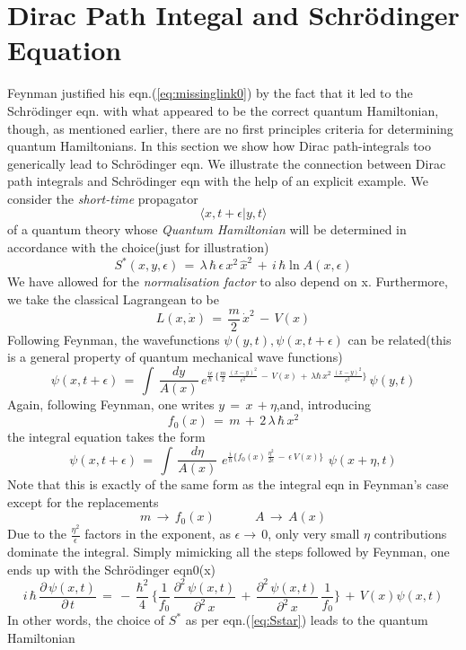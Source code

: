 \documentclass[a4paper]{JHEP3}
\newcommand{\be}{\begin{equation}}
\newcommand{\ee}{\end{equation}}
\begin{document}
\section{Dirac Path Integal and Schr\"odinger Equation}
Feynman justified his eqn.(\ref{eq:missinglink0}) by the fact that it led to the Schr\"odinger eqn. with what appeared to be the correct
quantum Hamiltonian, though, as mentioned earlier, there are no first principles criteria for determining quantum Hamiltonians. In this section
we show how Dirac path-integrals too generically lead to Schr\"odinger eqn. We illustrate the connection between Dirac path integrals and 
Schr\"odinger eqn with the help of an explicit example. We consider the 
{\it short-time} propagator
\be
\langle x,t+\epsilon|y,t\rangle
\ee
of a quantum theory whose {\it Quantum Hamiltonian} will be determined in accordance with the choice(just for illustration) 
\be
\label{eq:Sstar}
S^*(x,y,\epsilon)\,=\,\lambda\,\hbar\,\epsilon\,x^2\,{\hat x}^2\,+\,i\,\hbar\ln{A(x,\epsilon)}
\ee
We have allowed for the \emph{normalisation factor} to also depend on x. Furthermore, we take the classical Lagrangean to be
\be
L(x, {\dot x})\,=\,\frac{m}{2}\,{\dot x}^2\,-\,V(x)
\ee
Following Feynman, the wavefunctions $\psi(y,t),\psi(x,t+\epsilon)$ can be related(this is a general property of quantum mechanical wave
functions)
\be
\psi(x,t+\epsilon)\,=\,\int\,\frac{dy}{A(x)}\,e^{\frac{i\epsilon}{\hbar}\,\{\frac{m}{2}\,\frac{(x-y)^2}{\epsilon^2}\,-\,V(x)\,+\,\lambda\hbar\,x^2\,\frac{(x-y)^2}{\epsilon^2}\}}\,\psi(y,t)
\ee
Again, following Feynman, one writes $y\,=\,x\,+\eta$,and, introducing 
\be
f_0(x)\,=\,m\,+\,2\,\lambda\,\hbar\,x^2
\ee
the integral equation takes the form
\be
\psi(x,t+\epsilon)\,=\,\int\,\frac{d\eta}{A(x)}\,\,e^{\frac{i}{\hbar}\{f_0(x)\,\frac{\eta^2}{2\epsilon} \,-\,\epsilon\,V(x)\}}\,
\,\psi(x+\eta,t)
\ee
Note that this is exactly of the same form as the integral eqn in Feynman's case except for the replacements
\be
m\,\rightarrow\,f_0(x)\quad\quad\quad\,A\,\rightarrow\,A(x)
\ee
Due to the $\frac{\eta^2}{\epsilon}$ factors in the exponent, as 
$\epsilon\rightarrow\,0$, only very small $\eta$ contributions dominate the integral. Simply mimicking all the steps followed by Feynman, one 
ends up with the Schr\"odinger eqn0(x)\,\
\be
i\,\hbar\,\frac{\partial\,\psi(x,t)}{\partial\,t}\,=\,-\,\frac{\hbar^2}{4}\,
\{\frac{1}{f_0}\,\frac{{\partial}^2\,\psi(x,t)}{{\partial}^2\,x}\,+\, \frac{{\partial}^2\,\psi(x,t)}{{\partial}^2\,x}\,\frac{1}{f_0}\}
\,+\,V(x)\psi(x,t)
\ee
In other words, the choice of $S^*$ as per eqn.(\ref{eq:Sstar}) leads to the quantum Hamiltonian
\end{document}
